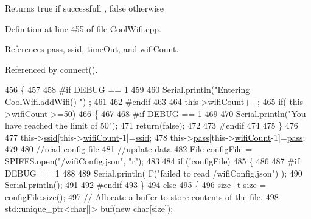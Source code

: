 \begin{DoxyReturn}{Returns}
true if successfull , false otherwise 
\end{DoxyReturn}


Definition at line 455 of file Cool\+Wifi.\+cpp.



References pass, ssid, time\+Out, and wifi\+Count.



Referenced by connect().


\begin{DoxyCode}
456 \{
457 
458 \textcolor{preprocessor}{#if DEBUG == 1}
459     
460     Serial.println(\textcolor{stringliteral}{"Entering CoolWifi.addWifi() "}) ;
461 
462 \textcolor{preprocessor}{#endif  }
463     
464     this->\hyperlink{classCoolWifi_ab133bd92fcb895b884deecd6678592e4}{wifiCount}++;
465     \textcolor{keywordflow}{if}( this->\hyperlink{classCoolWifi_ab133bd92fcb895b884deecd6678592e4}{wifiCount} >=50)
466     \{
467     
468 \textcolor{preprocessor}{    #if DEBUG == 1}
469 
470         Serial.println(\textcolor{stringliteral}{"You have reached the limit of 50"});
471         \textcolor{keywordflow}{return}(\textcolor{keyword}{false});  
472     
473 \textcolor{preprocessor}{    #endif}
474 
475     \}
476 
477     this->\hyperlink{classCoolWifi_a893b21d0fed821438733bba2e73fb4c2}{ssid}[this->\hyperlink{classCoolWifi_ab133bd92fcb895b884deecd6678592e4}{wifiCount}-1]=\hyperlink{classCoolWifi_a893b21d0fed821438733bba2e73fb4c2}{ssid};
478     this->\hyperlink{classCoolWifi_a0c3332a149245aaad060b32593a54c9b}{pass}[this->\hyperlink{classCoolWifi_ab133bd92fcb895b884deecd6678592e4}{wifiCount}-1]=\hyperlink{classCoolWifi_a0c3332a149245aaad060b32593a54c9b}{pass};
479     
480     \textcolor{comment}{//read config file}
481     \textcolor{comment}{//update data}
482     File configFile = SPIFFS.open(\textcolor{stringliteral}{"/wifiConfig.json"}, \textcolor{stringliteral}{"r"});
483 
484     \textcolor{keywordflow}{if} (!configFile) 
485     \{
486     
487 \textcolor{preprocessor}{    #if DEBUG == 1 }
488 
489         Serial.println( F(\textcolor{stringliteral}{"failed to read /wifiConfig.json"}) );
490         Serial.println();
491 
492 \textcolor{preprocessor}{    #endif}
493     \}
494     \textcolor{keywordflow}{else}
495     \{
496         \textcolor{keywordtype}{size\_t} size = configFile.size();
497         \textcolor{comment}{// Allocate a buffer to store contents of the file.}
498         std::unique\_ptr<char[]> buf(\textcolor{keyword}{new} \textcolor{keywordtype}{char}[size]);

\end{DoxyCode}
